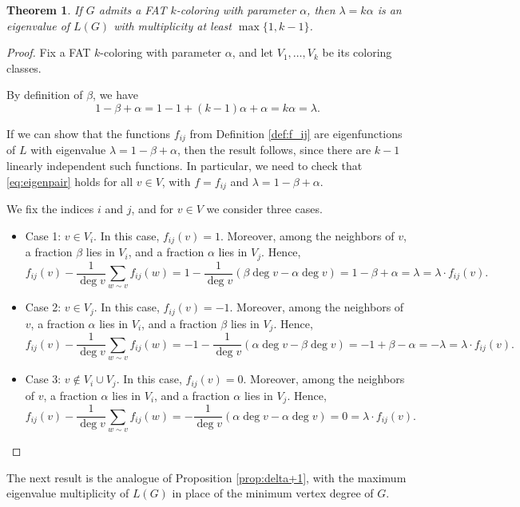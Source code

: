 \documentclass{article}
\theoremstyle{plain}
\newtheorem{theorem}{Theorem}[section]
\theoremstyle{definition}
\theoremstyle{remark}
\begin{document}
\begin{theorem}\label{thm:lambda}
    If $G$ admits a FAT $k$-coloring with parameter $\alpha$, then $\lambda=k\alpha$ is an eigenvalue of $L(G)$ with multiplicity at least $\max\{1,k-1\}$.
\end{theorem}

\begin{proof}
Fix a FAT $k$-coloring with parameter $\alpha$, and let $V_1,\ldots,V_k$ be its coloring classes. \newline

By definition of $\beta$, we have 
$$
1-\beta+\alpha = 1-1+ (k-1)\alpha + \alpha = k\alpha = \lambda.
$$

If we can show that the functions $f_{ij}$ from Definition \ref{def:f_ij} are eigenfunctions of $L$ with eigenvalue $\lambda=1-\beta+\alpha$, then the result follows, since there are $k-1$ linearly independent such functions. In particular, we need to check that \eqref{eq:eigenpair} holds for all $v\in V$, with $f=f_{ij}$ and $\lambda=1-\beta+\alpha$.\newline

We fix the indices $i$ and $j$, and for $v\in V$ we consider three cases.

\begin{itemize}

\item Case 1: $v\in V_i$. In this case, $f_{ij}(v)=1$. Moreover, among the neighbors of $v$, a fraction $\beta$ lies in $V_i$, and a fraction $\alpha$ lies in $V_j$. Hence,
$$
f_{ij}(v)-\frac{1}{\deg v}\sum_{w\sim v}f_{ij}(w)=1-\frac{1}{\deg v}\left(\beta \deg v- \alpha \deg v \right)=1-\beta + \alpha = \lambda = \lambda \cdot f_{ij}(v).
$$
    
    \item Case 2: $v\in V_j$. In this case, $f_{ij}(v)=-1$. Moreover, among the neighbors of $v$, a fraction $\alpha$ lies in $V_i$, and a fraction $\beta$ lies in $V_j$. Hence,
$$
f_{ij}(v)-\frac{1}{\deg v}\sum_{w\sim v}f_{ij}(w)=-1-\frac{1}{\deg v}\left(\alpha \deg v- \beta \deg v \right)=-1+\beta - \alpha = -\lambda = \lambda \cdot f_{ij}(v).
$$

    
    \item Case 3: $v\notin V_i\cup V_j$. In this case, $f_{ij}(v)=0$. Moreover, among the neighbors of $v$, a fraction $\alpha$ lies in $V_i$, and a fraction $\alpha$ lies in $V_j$. Hence,
$$
f_{ij}(v)-\frac{1}{\deg v}\sum_{w\sim v}f_{ij}(w)=-\frac{1}{\deg v}\left(\alpha \deg v- \alpha \deg v \right)=0=\lambda \cdot f_{ij}(v).
$$

    
\end{itemize}



\end{proof}
The next result is the analogue of Proposition \ref{prop:delta+1}, with the maximum eigenvalue multiplicity of $L(G)$ in place of the minimum vertex degree of $G$.
\end{document}
